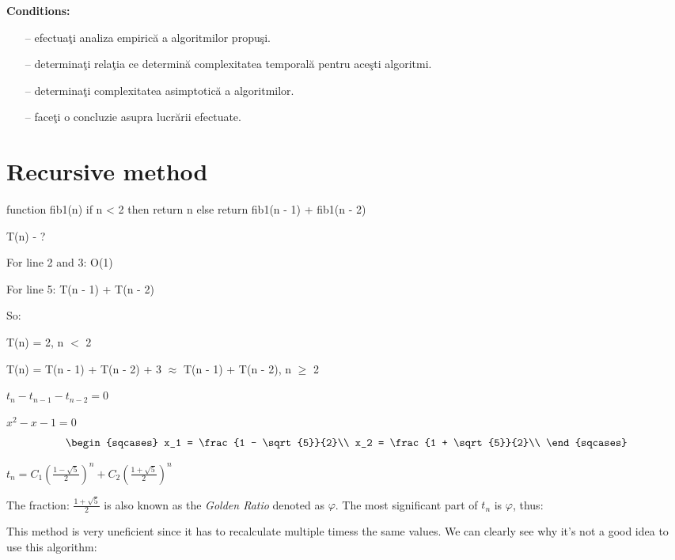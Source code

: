 \documentclass{article}
\begin{document}
	{\large \textbf{Conditions:}}
	\begin{enumerate}
		\item[--] efectuaţi analiza empirică a algoritmilor propuşi.
		\item[--] determinaţi relaţia ce determină complexitatea temporală pentru aceşti algoritmi.
		\item[--] determinaţi complexitatea asimptotică a algoritmilor.
		\item[--] faceţi o concluzie asupra lucrării efectuate.
	\end{enumerate}

	\newpage
	\section{Recursive method}

	\begin{algorithm}[caption={Recursive method}, label={Fibonacci1}]
function fib1(n)
	if n < 2 then
		return n
	else
		return fib1(n - 1) + fib1(n - 2)
	\end{algorithm}
	\begin{center} T(n) - ? \end{center}
	\par For line 2 and 3: O(1)
	\par For line 5: T(n - 1) + T(n - 2)
	\par So:
	\par T(n) = 2, n $<$ 2
	\par T(n) = T(n - 1) + T(n - 2) + 3 $\approx$ T(n - 1) + T(n - 2), n $\geq$ 2
	\begin{center}
		$t_{n} - t_{n - 1} - t_{n - 2} = 0$
		\par $x^2 - x - 1 = 0$
		\[
			\begin{sqcases}
				x_1 = \frac{1 - \sqrt{5}}{2}\\
				x_2 = \frac{1 + \sqrt{5}}{2}\\
			\end{sqcases}
		\]

		$t_n = C_1 (\frac{1 - \sqrt{5}}{2})^n + C_2 (\frac{1 + \sqrt{5}}{2})^n$
	\end{center}
	\par The fraction: \textit{$\frac{1 + \sqrt{5}}{2}$} is also known as the \textit{Golden Ratio} denoted as $\varphi$.
	The most significant part of $t_n$ is $\varphi$, thus:


	\par This method is very uneficient since it has to recalculate multiple timess the same values. We can clearly see why it's not a good idea to use this algorithm:
\end{document}
